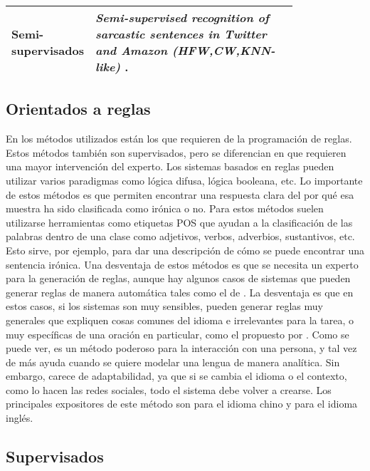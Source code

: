 \begin{table}[h]
\begin{tabular}{|l|p{0.8\linewidth}|}
		Semi-supervisados   & \textit{Semi-supervised recognition of sarcastic sentences in Twitter and Amazon (HFW,CW,KNN-like)} \textcite{davidov2010semi}. \\ \hline
	\end{tabular}
	\label{tab:metodos}
\end{table}

\subsection{Orientados a reglas}
\par En los métodos utilizados están los que requieren de la programación de reglas. Estos métodos también son supervisados, pero se diferencian en que requieren una mayor intervención del experto. Los sistemas basados en reglas pueden utilizar varios paradigmas como lógica difusa, lógica booleana, etc. Lo importante de estos métodos es que permiten encontrar una respuesta clara del por qué esa muestra ha sido clasificada como irónica o no. Para estos métodos suelen utilizarse herramientas como etiquetas \gls{POS} que ayudan a la clasificación de las palabras dentro de una clase como adjetivos, verbos, adverbios, sustantivos, etc. Esto sirve, por ejemplo, para dar una descripción de cómo se puede encontrar una sentencia irónica. Una desventaja de estos métodos es que se necesita un experto para la generación de reglas, aunque hay algunos casos de sistemas que pueden generar reglas de manera automática tales como el de \textcite{mitra1995fuzzy}. La desventaja es que en estos casos, si los sistemas son muy sensibles, pueden generar reglas muy generales que expliquen cosas comunes del idioma e irrelevantes para la tarea, o muy específicas de una oración en particular, como el propuesto por \textcite{kotsiantis2007supervised}. Como se puede ver, es un método poderoso para la interacción con una persona, y tal vez de más ayuda cuando se quiere modelar una lengua de manera analítica. Sin embargo, carece de adaptabilidad, ya que si se cambia el idioma o el contexto, como lo hacen las redes sociales, todo el sistema debe volver a crearse. Los principales expositores de este método son \textcite{kong2011formalization} para el idioma chino  y \textcite{utsumi1995interpret} para el idioma inglés.

\subsection{Supervisados}


